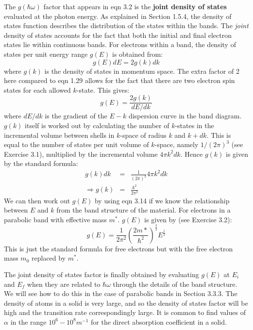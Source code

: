 \documentclass[12pt]{book}
\begin{document}
The $g(\hbar\omega)$ factor that appears in eqn 3.2 is the \textbf{joint density of states} evaluated at the photon energy. As explained in Section 1.5.4, the density of states function describes the distribution of the states within the bands. The \textit{joint} density of states accounts for the fact that both the initial and final electron states lie within continuous bands. For electrons within a band, the density of states per unit energy range $g(E)$ is obtained from:
\begin{equation}\label{equa:3.13}
  g(E)dE=2g(k)dk
\end{equation}
where $g(k)$ is the density of states in momentum space. The extra factor of 2 here compared to eqn 1.29 allows for the fact that there are two electron spin states for each allowed $k$-state. This gives:
\begin{equation}\label{equa:3.14}
  g(E)=\frac{2g(k)}{dE/dk}
\end{equation}
where $dE/dk$ is the gradient of the $E-k$ dispersion curve in the band diagram. $g(k)$ itself is worked out by calculating the number of $k$-states in the incremental volume between shells in $k$-space of radius $k$ and $k + dk$. This is equal to the number of states per unit volume of $k$-space, namely $1/(2\pi)^3$ (see Exercise 3.1), multiplied by the incremental volume $4\pi k^2dk$. Hence $g(k)$ is given by the standard formula:
\begin{eqnarray}\label{equa:3.15}
  g(k)dk &=& \frac{1}{(2\pi)^3}4\pi k^2dk \\
  \Rightarrow g(k) &=& \frac{k^2}{2\pi^2}
\end{eqnarray}
We can then work out $g(E)$ by using eqn 3.14 if we know the relationship between $E$ and $k$ from the band structure of the material. For electrons in a parabolic band with effective mass $m^*$. $g(E)$ is given by (see Exercise 3.2):
\begin{equation}\label{equa:3.16}
  g(E)=\frac{1}{2\pi^2}(\frac{2m*}{\hbar^2})^{\frac{3}{2}}E^{\frac{1}{2}}
\end{equation}
This is just the standard formula for free electrons but with the free electron mass $m_0$ replaced by  $m^*$.

The joint density of states factor is finally obtained by evaluating $g(E)$ at $E_i$ and $E_f$ when they are related to $\hbar\omega$ through the details of the band structure. We will see how to do this in the case of parabolic bands in Section 3.3.3. The density of atoms in a solid is very large, and so the density of states factor will be high and the transition rate correspondingly large. It is common to find values of $\alpha$ in the range $10^6-10^8 m^{-1}$ for the direct absorption coefficient in a solid.
\end{document}
